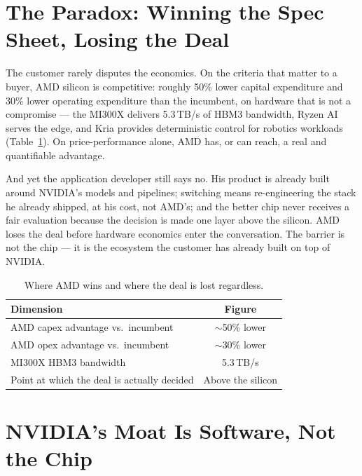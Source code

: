\documentclass[blind]{gtac}
\begin{document}
\section{The Paradox: Winning the Spec Sheet, Losing the Deal}
\label{sec:paradox}

The customer rarely disputes the economics. On the criteria that matter to a buyer, AMD silicon is competitive: roughly 50\% lower capital expenditure and 30\% lower operating expenditure than the incumbent, on hardware that is not a compromise --- the MI300X delivers 5.3\,TB/s of HBM3 bandwidth, Ryzen AI serves the edge, and Kria provides deterministic control for robotics workloads (Table~\ref{tab:paradox}). On price-performance alone, AMD has, or can reach, a real and quantifiable advantage.

And yet the application developer still says no. His product is already built around NVIDIA's models and pipelines; switching means re-engineering the stack he already shipped, at his cost, not AMD's; and the better chip never receives a fair evaluation because the decision is made one layer above the silicon. AMD loses the deal before hardware economics enter the conversation. The barrier is not the chip --- it is the ecosystem the customer has already built on top of NVIDIA.

\begin{table}[H]
\centering
\caption{Where AMD wins and where the deal is lost regardless.}
\label{tab:paradox}
\tiny
\begin{tabular}{@{}lc@{}}
\toprule
Dimension & Figure \\
\midrule
AMD capex advantage vs.\ incumbent & $\sim$50\% lower \\
AMD opex advantage vs.\ incumbent & $\sim$30\% lower \\
MI300X HBM3 bandwidth & 5.3\,TB/s \\
Point at which the deal is actually decided & Above the silicon \\
\bottomrule
\end{tabular}
\end{table}

\section{NVIDIA's Moat Is Software, Not the Chip}
\label{sec:moat}
\end{document}
